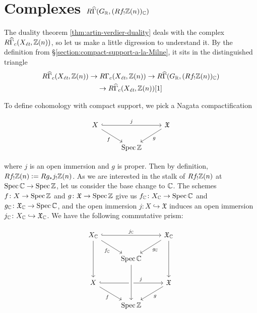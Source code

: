 
\section{Complexes
  \texorpdfstring{$R\widehat{\Gamma} (G_{\mathbb{R}}, (Rf_! \mathbb{Z} (n))_{\mathbb{C}})$}{RΓ\^{} (G\_R, (Rf\_! Z(n))\_C)}}
\label{section:complexes-RGamma-GR-Rf!-Zn-C}

The duality theorem \ref{thm:artin-verdier-duality} deals with the complex
$R\widehat{\Gamma}_c (X_\text{\it ét}, \mathbb{Z} (n))$, so let us make a little
digression to understand it. By the definition from
\S\ref{section:compact-support-a-la-Milne}, it sits in the distinguished
triangle
\begin{multline*}
  R\widehat{\Gamma}_c (X_\text{\it ét}, \mathbb{Z} (n)) \to
  R\Gamma_c (X_\text{\it ét}, \mathbb{Z} (n)) \to
  R\widehat{\Gamma} (G_{\mathbb{R}}, (R f_! \mathbb{Z} (n))_{\mathbb{C}}) \\
  \to R\widehat{\Gamma}_c (X_\text{\it ét}, \mathbb{Z} (n)) [1]
\end{multline*}

To define cohomology with compact support, we pick a Nagata compactification

\[ \begin{tikzcd}
    X \ar[hookrightarrow]{rr}{j}\ar{dr}[swap]{f} & & \mathfrak{X} \ar{dl}{g} \\
    & \Spec \ZZ
  \end{tikzcd} \]

\noindent where $j$ is an open immersion and $g$ is proper. Then by definition,
$R f_! \mathbb{Z} (n) \mathrel{\mathop:}= R g_* j_! \mathbb{Z} (n)$. As we are interested in the stalk of
$R f_! \mathbb{Z} (n)$ at $\operatorname{Spec} \mathbb{C} \to \operatorname{Spec} \mathbb{Z}$, let us consider the base change to
$\mathbb{C}$. The schemes $f\colon X\to \operatorname{Spec} \mathbb{Z}$ and
$g\colon \mathfrak{X} \to \operatorname{Spec} \mathbb{Z}$ give us $f_{\mathbb{C}}\colon X_{\mathbb{C}}\to \operatorname{Spec} \mathbb{C}$
and $g_{\mathbb{C}}\colon \mathfrak{X}_{\mathbb{C}} \to \operatorname{Spec} \mathbb{C}$, and the open immersion
$j\colon X\hookrightarrow \mathfrak{X}$ induces an open immersion
$j_{\mathbb{C}}\colon X_{\mathbb{C}}\hookrightarrow \mathfrak{X}_{\mathbb{C}}$. We have the following
commutative prism:

\[ \begin{tikzcd}
    X_\CC\ar[hookrightarrow]{rr}{j_\CC}\ar{dr}[swap]{f_\CC}\ar{dd} & & \mathfrak{X}_\CC \ar{dl}{g_\CC}\ar{dd} \\
    & \Spec \CC & \\
    X \ar[hookrightarrow,pos=0.65]{rr}{j}\ar{dr}[swap]{f} & & \mathfrak{X} \ar{dl}{g} \\
    & \Spec \ZZ\ar[leftarrow,crossing over]{uu}
  \end{tikzcd} \]

